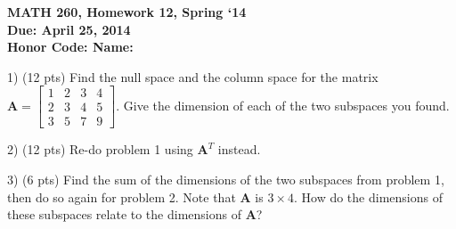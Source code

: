 \documentclass{article}
\begin{document}
\begin{flushleft}
	\bfseries{MATH 260, Homework 12, Spring `14}\\
	\bfseries{Due: April 25, 2014}\\
	\bfseries{Honor Code:} \hspace{3.5in}\bfseries{Name:}\\
\end{flushleft}
\begin{flushleft}
\vspace{.25in}

1) (12 pts) Find the null space and the column space for the matrix $\textbf{A} = \begin{bmatrix} 1&2&3&4 \\ 2&3&4&5\\ 3&5&7&9 \end{bmatrix}$.  Give the dimension of each of the two subspaces you found.


\newpage

2) (12 pts) Re-do problem 1 using $\textbf{A}^T$ instead.

\vspace{6.5in}

3) (6 pts) Find the sum of the dimensions of the two subspaces from problem 1, then do so again for problem 2.  Note that $\textbf{A}$ is $3 \times 4$.  How do the dimensions of these subspaces relate to the dimensions of $\textbf{A}$?

\end{flushleft}
\end{document}
